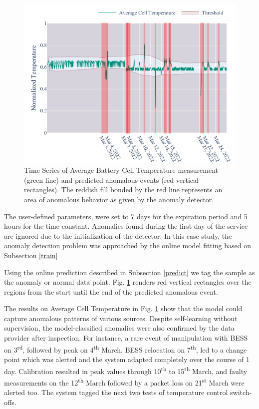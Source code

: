 \begin{figure}[htbp]
    \centerline{\includegraphics{figures/Average_Cell_Temperature_168_hours_sliding_thresh.pdf}}
    \caption{Time Series of Average Battery Cell Temperature measurement (green line) and predicted anomalous events (red vertical rectangles). The reddish fill bonded by the red line represents an area of anomalous behavior as given by the anomaly detector.}
    \label{fig:threshold}
\end{figure}

The user-defined parameters, were set to 7 days for the expiration period and 5 hours for the time constant. Anomalies found during the first day of the service are ignored due to the initialization of the detector. In this case study, the anomaly detection problem was approached by the online model fitting based on Subsection \ref{train}

Using the online prediction described in Subsection \ref{predict} we tag the sample as the anomaly or normal data point. Fig. \ref{fig:threshold} renders red vertical rectangles over the regions from the start until the end of the predicted anomalous event. 

The results on Average Cell Temperature in Fig. \ref{fig:threshold} show that the model could capture anomalous patterns of various sources. Despite self-learning without supervision, the model-classified anomalies were also confirmed by the data provider after inspection. For instance, a rare event of manipulation with BESS on 3\textsuperscript{rd}, followed by peak on 4\textsuperscript{th} March. BESS relocation on 7\textsuperscript{th}, led to a change point which was alerted and the system adapted completely over the course of 1 day. Calibration resulted in peak values through 10\textsuperscript{th} to 15\textsuperscript{th} March, and faulty measurements on the 12\textsuperscript{th} March followed by a packet loss on 21\textsuperscript{st} March were alerted too. The system tagged the next two tests of temperature control switch-offs. 

